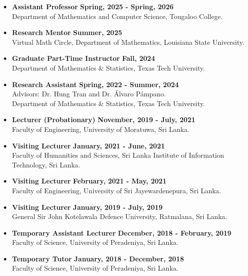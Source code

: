 \documentclass[12pt]{book}
\begin{document}
\begin{itemize}

\item \textbf{Assistant Professor} \hfill \textbf{Spring, 2025 - Spring, 2026}\\
Department of Mathematics and Computer Science, Tougaloo College.
\item \textbf{Research Mentor} \hfill \textbf{Summer, 2025}\\
Virtual Math Circle, Department of Mathematics, Louisiana State University.
	\item \textbf{Graduate Part-Time Instructor} \hfill \textbf{Fall, 2024}\\
Department of Mathematics \& Statistics, Texas Tech University.



\item \textbf{Research Assistant} \hfill \textbf{Spring, 2022 - Summer, 2024} \\
Advisors: Dr. Hung Tran and Dr. \'Alvaro P\'ampano.\\
Department of Mathematics \& Statistics, Texas Tech University.

\item \textbf{Lecturer (Probationary)} \hfill \textbf{November, 2019 - July, 2021}\\
Faculty of Engineering, University of Moratuwa, Sri Lanka.

\item \textbf{Visiting Lecturer} \hfill \textbf{January, 2021 - June, 2021}\\
Faculty of Humanities and Sciences, Sri Lanka Institute of Information Technology, Sri Lanka.

\item \textbf{Visiting Lecturer} \hfill \textbf{February, 2021 - May, 2021}\\
Faculty of Engineering, University of Sri Jayewardenepura, Sri Lanka.

\item \textbf{Visiting Lecturer} \hfill \textbf{January, 2019 - July, 2019}\\
General Sir John Kotelawala Defence University, Ratmalana, Sri Lanka.

\item \textbf{Temporary Assistant Lecturer} \hfill \textbf{December, 2018 - February, 2019}\\
Faculty of Science, University of Peradeniya, Sri Lanka.

\item \textbf{Temporary Tutor} \hfill \textbf{January, 2018 - December, 2018}\\
Faculty of Science, University of Peradeniya, Sri Lanka.
\end{itemize}
\end{document}
